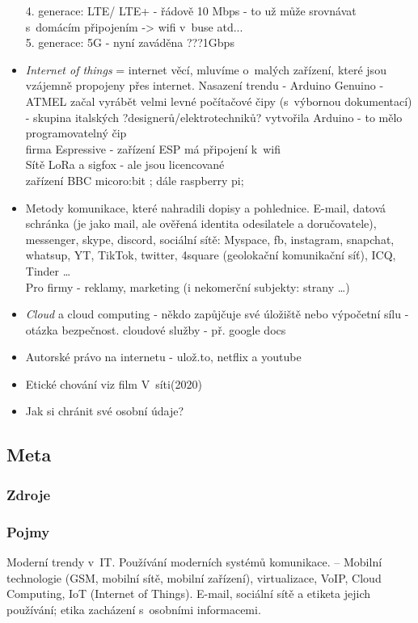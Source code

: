 \documentclass[12pt]{article}
\begin{document}
\begin{itemize}
4. generace: LTE/ LTE+ - řádově 10 Mbps - to už může srovnávat s~domácím připojením -> wifi v~buse atd...\\
5. generace: 5G - nyní zaváděna ???1Gbps\\
\item \emph{Internet of things} = internet věcí, mluvíme o~malých zařízení, které jsou vzájemně propojeny přes internet. Nasazení trendu - Arduino Genuino - ATMEL začal vyrábět velmi levné počítačové čipy (s~výbornou dokumentací) - skupina italských ?designerů/elektrotechniků? vytvořila Arduino - to mělo programovatelný čip\\
firma Espressive - zařízení ESP má připojení k~wifi\\
Sítě LoRa a sigfox - ale jsou licencované\\
zařízení BBC micoro:bit ; dále raspberry pi;
\item Metody komunikace, které nahradili dopisy a pohlednice. E-mail, datová schránka (je jako mail, ale ověřená identita odesilatele a doručovatele), messenger, skype, discord, sociální sítě: Myspace, fb, instagram, snapchat, whatsup, YT, TikTok, twitter, 4square (geolokační komunikační síť), ICQ, Tinder \dots \\
Pro firmy - reklamy, marketing (i nekomerční subjekty: strany \dots)
\item \emph{Cloud} a cloud computing - někdo zapůjčuje své úložiště nebo výpočetní sílu - otázka bezpečnost.  cloudové služby - př. google docs\\
\item Autorské právo na internetu - ulož.to, netflix a youtube
\item Etické chování viz film V~síti(2020)
\item Jak si chránit své osobní údaje?
\end{itemize}
\subsection{Meta}
\subsubsection{Zdroje}
\subsubsection{Pojmy}
Moderní trendy v~IT. Používání moderních systémů komunikace. – Mobilní technologie (GSM, mobilní sítě, mobilní zařízení), virtualizace, VoIP, Cloud Computing, IoT (Internet of Things). E-mail, sociální sítě a etiketa jejich používání; etika zacházení s~osobními informacemi. 
\end{document}

